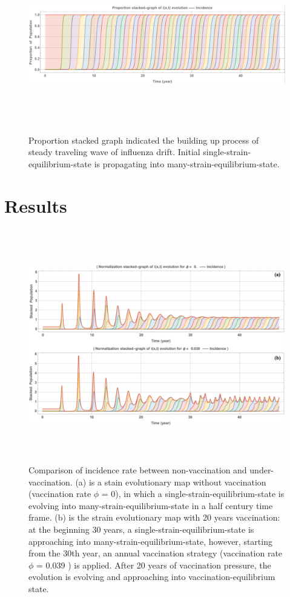 \documentclass[preprint,12pt]{elsarticle}
\begin{document}
\begin{figure}
  \centering
  \includegraphics[width=6in,height=3in]{figures/Proportion}
  \caption{Proportion stacked graph indicated the building up process of steady traveling wave of influenza drift.
  Initial single-strain-equilibrium-state is propagating into many-strain-equilibrium-state.}
\label{fig:Proportion}
\end{figure}



\section{Results}


\begin{figure}
  \centering
  \includegraphics[width=6in,height=4in]{figures/UnderVaccination}
  \caption{Comparison of incidence rate between non-vaccination and under-vaccination.
  (a) is a stain evolutionary map without vaccination (vaccination rate \(\phi\) = 0), in which a single-strain-equilibrium-state is evolving into many-strain-equilibrium-state in a half century time frame. 
  (b) is the strain evolutionary map with 20 years vaccination: at the beginning 30 years, a single-strain-equilibrium-state is approaching into many-strain-equilibrium-state, however, starting from the 30th year, an annual vaccination strategy (vaccination rate \(\phi\) = 0.039 ) is applied. 
  After 20 years of vaccination pressure, the evolution is evolving and approaching into vaccination-equilibrium state.}
\label{fig:UnderVaccination}
\end{figure}
\end{document}

